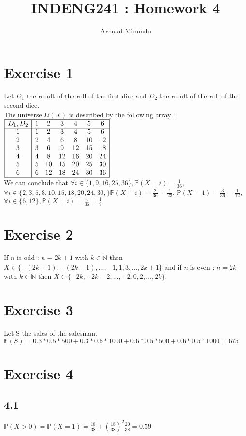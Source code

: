 \documentclass{article}
\title{INDENG241 : Homework 4}
\author{Arnaud Minondo}
\begin{document}
\maketitle
    \section*{Exercise 1}
    Let $D_1$ the result of the roll of the first dice and $D_2$ the result of the roll of the second dice.\\
    The universe $\Omega(X)$ is described by the following array :\\
    $
    \begin{array}{|c|cccccc|}
        \hline
         D_1,D_2& 1& 2 & 3&4  &5 &6\\
        \hline
        1 & 1&2&3&4&5&6\\
        2 & 2&4&6&8&10&12\\
        3 & 3&6&9&12&15&18\\
        4 & 4&8&12&16&20&24\\
        5 & 5&10&15&20&25&30\\
        6 & 6&12&18&24&30&36\\
        \hline
    \end{array}$\\
    We can conclude that $\forall i \in\{1,9,16,25,36\}, \mathbb{P}(X=i) = \frac{1}{36}$, $\forall i \in\{2,3,5,8,10,15,18,20,24,30,\}\mathbb{P}(X=i) = \frac{2}{36} = \frac{1}{23}$, $\mathbb{P}(X=4)=\frac{3}{36}=\frac{1}{12}$, $\forall i \in \{6,12\} , \mathbb{P}(X=i) = \frac{4}{36} = \frac{1}{9} $
    \section*{Exercise 2}
    If $n$ is odd : $n=2k+1$ with $k\in\mathbb{N}$ then $X\in\{-(2k+1),-(2k-1),...,-1,1,3,...,2k+1\}$ and if $n$ is even : $n=2k$ with $k\in\mathbb{N}$ then $X\in\{-2k,-2k-2,...,-2,0,2,...,2k\}$.
    \section*{Exercise 3}
    Let S the sales of the salesman.
    $\mathbb{E}(S) = 0.3*0.5*500+0.3*0.5*1000+0.6*0.5*500+0.6*0.5*1000 = 675$
    \section*{Exercise 4}
    \subsection*{4.1}
    $\mathbb{P}(X>0) = \mathbb{P}(X=1) = \frac{18}{38}+(\frac{18}{38})^2\frac{20}{38} = 0.59$
\end{document}
